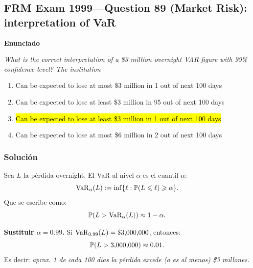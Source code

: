 ﻿\subsection{FRM Exam 1999---Question 89 (Market Risk): interpretation of VaR}

\textbf{Enunciado}

\emph{What is the correct
interpretation of a \$3 million overnight VAR figure with 99\% confidence
level? The institution}
\begin{enumerate}[label=\alph*.]
\item {Can be expected to lose at most \$3 million in 1 out of next 100 days}
\item {Can be expected to lose at least \$3 million in 95 out of next 100 days}
\item \hl{Can be expected to lose at least \$3 million in 1 out of next 100 days}
\item {Can be expected to lose at most \$6 million in 2 out of next 100 days}
\end{enumerate}

\subsubsection*{Solución}



Sea \(L\) la pérdida overnight. El VaR al nivel \(\alpha\) es el cuantil \(\alpha\):
\[
\mathrm{VaR}_\alpha(L):=\inf\{\ell:\mathbb{P}(L\leqslant \ell)\geqslant \alpha\}.
\]
Que se escribe como:
\[
\mathbb{P}(L>\mathrm{VaR}_\alpha(L))\approx 1-\alpha.
\]

\textbf{Sustituir \(\alpha=0.99\).} Si \(\mathrm{VaR}_{0.99}(L)=\$3{,}000{,}000\), entonces:
\[
\mathbb{P}(L>3{,}000{,}000)\approx 0.01.
\]
Es decir: \emph{aprox. 1 de cada 100 días la pérdida excede (o es al menos) \$3 millones.}


